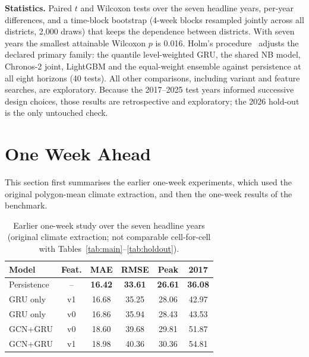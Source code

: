 \textbf{Statistics.} Paired $t$ and Wilcoxon tests over the seven headline years, per-year differences, and a time-block bootstrap (4-week blocks resampled jointly across all districts, 2{,}000 draws) that keeps the dependence between districts. With seven years the smallest attainable Wilcoxon $p$ is 0.016. Holm's procedure~\cite{holm1979simple} adjusts the declared primary family: the quantile level-weighted GRU, the shared NB model, Chronos-2 joint, LightGBM and the equal-weight ensemble against persistence at all eight horizons (40 tests). All other comparisons, including variant and feature searches, are exploratory. Because the 2017--2025 test years informed successive design choices, those results are retrospective and exploratory; the 2026 hold-out is the only untouched check.

\section{One Week Ahead}
\label{sec:h1}

This section first summarises the earlier one-week experiments, which used the original polygon-mean climate extraction, and then the one-week results of the benchmark.

\begin{table}[t]
\centering
\caption{Earlier one-week study over the seven headline years (original climate extraction; not comparable cell-for-cell with Tables~\ref{tab:main}--\ref{tab:holdout}).}
\label{tab:h1baseline}
\begin{tabular}{lccccc}
\toprule
\textbf{Model} & \textbf{Feat.} & \textbf{MAE} & \textbf{RMSE} & \textbf{Peak} & \textbf{2017} \\
\midrule
Persistence & -- & \textbf{16.42} & \textbf{33.61} & \textbf{26.61} & \textbf{36.08} \\
GRU only & v1 & 16.68 & 35.25 & 28.06 & 42.97 \\
GRU only & v0 & 16.86 & 35.94 & 28.43 & 43.53 \\
GCN+GRU & v0 & 18.60 & 39.68 & 29.81 & 51.87 \\
GCN+GRU & v1 & 18.98 & 40.36 & 30.36 & 54.81 \\
\bottomrule
\end{tabular}
\end{table}

